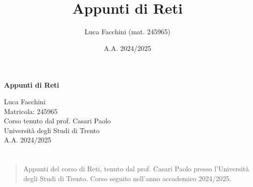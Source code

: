 \documentclass[twoside]{report}
\title{Appunti di Reti}
\author{Luca Facchini (mat. 245965)}
\date{A.A. 2024/2025}
\makeatletter
\renewenvironment{abstract}{%
    \if@twocolumn
        \section*{\abstractname}%
    \else
        \begin{center}%
            {\bfseries \abstractname\vspace{-.5em}\vspace{\z@}}%
        \end{center}%
        \small
        \begin{quotation}
    \fi}
    {\if@twocolumn\else\end{quotation}\fi}
\makeatother
\begin{document}
    \begin{titlepage}
        \centering  %
        {\Huge\textbf{Appunti di Reti}} \\[1cm] %
        \vspace{0.5cm}
        
        {\Large Luca Facchini} \\ %
        \vspace{0.3cm}
        {\large Matricola: 245965} \\[2cm] %
        
        {\large Corso tenuto dal prof. Casari Paolo} \\[0.3cm] %
        {\large Università degli Studi di Trento} \\[1.5cm]
        
        {\large A.A. 2024/2025} \\[3cm] %
        
        \vfill
        \begin{abstract}
            Appunti del corso di Reti, tenuto dal prof. Casari Paolo presso l'Università degli Studi di Trento. Corso seguito nell'anno accademico 2024/2025.
        \end{abstract}
        
        \vfill  %
    \end{titlepage}
    \begingroup
        \pagestyle{tocStyle}
        \tableofcontents
    \endgroup
    \pagestyle{stdPage}
    
    
    
    
\end{document}
